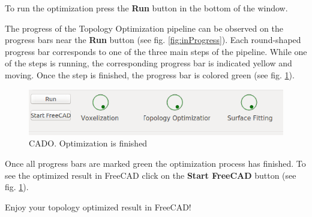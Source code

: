 \documentclass[
12pt, %
a4paper, %
oneside, %
headinclude,footinclude, %
BCOR5mm, %
]{scrartcl}
\begin{document}
To run the optimization press the \textbf{Run} button in the bottom of the window.

The progress of the Topology Optimization pipeline can be observed on the progress bars near the \textbf{Run} button (see fig. \ref{fig:inProgress}). Each round-shaped progress bar corresponds to one of the three main steps of the pipeline. While one of the steps is running, the corresponding progress bar is indicated yellow and moving. Once the step is finished, the progress bar is colored green (see fig. \ref{fig:progressBarsFinished}).

\begin{figure}
\centering
\includegraphics[scale=0.4]{Pictures/progressBar_ready.png}
\caption{CADO. Optimization is finished}
\label{fig:progressBarsFinished}
\end{figure}

Once all progress bars are marked green the optimization process has finished. To see the optimized result in FreeCAD click on the \textbf{Start FreeCAD} button (see fig. \ref{fig:progressBarsFinished}).

Enjoy your topology optimized result in FreeCAD!
\end{document}
